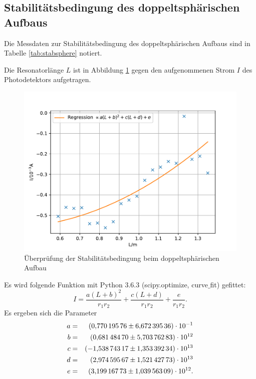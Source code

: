 \subsection{Stabilitätsbedingung des doppeltsphärischen Aufbaus}
Die Messdaten zur Stabilitätsbedingung des doppeltsphärischen Aufbaus sind in Tabelle \ref{tab:stabsphere} notiert.

Die Resonatorlänge $L$ ist in Abbildung \ref{fig:stabsphere} gegen den aufgenommenen Strom $I$ des Photodetektors aufgetragen.
\begin{figure}
  \centering
  \includegraphics[width=\textwidth]{stabsphere.pdf}
  \caption{Überprüfung der Stabilitätsbedingung beim doppeltsphärischen Aufbau}
  \label{fig:stabsphere}
\end{figure}
Es wird folgende Funktion mit Python 3.6.3 (scipy.optimize, curve$\_$fit) gefittet:
\begin{equation*}
  I= \frac{a(L+b)^2}{r_1 r_2}+\frac{c(L+d)}{r_1 r_2}+\frac{e}{r_1 r_2}.
\end{equation*}
Es ergeben sich die Parameter
\begin{align*}
a &=& \SI{0.77019576  \pm 6.67239536e-01}{} \\
b &=& \SI{0.68148470  \pm 5.70376283e+12}{} \\
c &=& \SI{-1.53874317 \pm 1.35339234e+13}{} \\
d &=& \SI{2.97459567  \pm 1.52142773e+13}{} \\
e &=& \SI{3.19916773  \pm 1.03956309e+12}{}. \\
\end{align*}
\FloatBarrier


